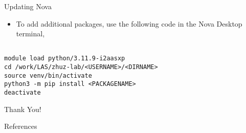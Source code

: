 \documentclass{beamer} %
\begin{document}
\begin{frame}[containsverbatim]{Updating Nova}
  \begin{itemize}
    \item To add additional packages, use the following code in the Nova Desktop
      terminal,
  \end{itemize}
\begin{verbatim}
  
module load python/3.11.9-i2aasxp
cd /work/LAS/zhuz-lab/<USERNAME>/<DIRNAME>
source venv/bin/activate
python3 -m pip install <PACKAGENAME>
deactivate
\end{verbatim}
\end{frame}

\begin{frame}
  \begin{center}
    {\Large Thank You!}
  \end{center}
\end{frame}

\begin{frame}[allowframebreaks]{References}
\printbibliography
\end{frame}
\end{document}
